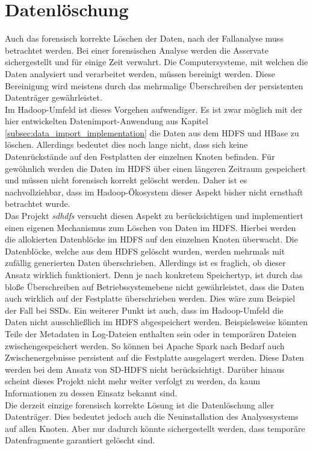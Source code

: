\section{Datenlöschung}
Auch das forensisch korrekte Löschen der Daten, nach der Fallanalyse muss betrachtet werden. Bei einer forensischen Analyse werden die Asservate sichergestellt und für einige Zeit verwahrt. Die Computersysteme, mit welchen die Daten analysiert und verarbeitet werden, müssen bereinigt werden. Diese Bereinigung wird meistens durch das mehrmalige Überschreiben der persistenten Datenträger gewährleistet.\\
 Im Hadoop-Umfeld ist dieses Vorgehen aufwendiger. Es ist zwar möglich mit der hier entwickelten Datenimport-Anwendung aus Kapitel \ref{subsec:data_import_implementation} die Daten aus dem HDFS und HBase zu löschen. Allerdings bedeutet dies noch lange nicht, dass sich keine Datenrückstände auf den Festplatten der einzelnen Knoten befinden.
Für gewöhnlich werden die Daten im HDFS über einen längeren Zeitraum gespeichert und müssen nicht forensisch korrekt gelöscht werden. Daher ist es nachvollziehbar, dass im Hadoop-Ökosystem dieser Aspekt bisher nicht ernsthaft betrachtet wurde.\\

\noindent
Das Projekt \textit{\gls{sdhdfs}} versucht diesen Aspekt zu berücksichtigen und implementiert einen eigenen Mechanismus zum Löschen von Daten im HDFS.\cite{sd_hdfs} Hierbei werden die allokierten Datenblöcke im HDFS auf den einzelnen Knoten überwacht. Die Datenblöcke, welche aus dem HDFS gelöscht wurden, werden mehrmals mit zufällig generierten Daten überschrieben. 
Allerdings ist es fraglich, ob dieser Ansatz wirklich funktioniert. Denn je nach konkretem Speichertyp, ist durch das bloße Überschreiben auf Betriebssystemebene nicht gewährleistet, dass die Daten auch wirklich auf der Festplatte überschrieben werden. 
Dies wäre zum Beispiel der Fall bei SSDs. Ein weiterer Punkt ist auch, dass im Hadoop-Umfeld die Daten nicht ausschließlich im HDFS abgespeichert werden. Beispielsweise könnten Teile der Metadaten in Log-Dateien enthalten sein oder in temporären Dateien zwischengespeichert werden. So können bei Apache Spark nach Bedarf auch Zwischenergebnisse persistent auf die Festplatte ausgelagert werden.\cite{spark_rdd} Diese Daten werden bei dem Ansatz von SD-HDFS nicht berücksichtigt. Darüber hinaus scheint dieses Projekt nicht mehr weiter verfolgt zu werden, da kaum Informationen zu dessen Einsatz bekannt sind.\\

\noindent
Die  derzeit einzige forensisch korrekte Lösung ist die Datenlöschung aller Datenträger. Dies bedeutet jedoch auch die Neuinstallation des Analysesystems auf allen Knoten. Aber nur dadurch könnte sichergestellt werden, dass temporäre Datenfragmente garantiert gelöscht sind.  